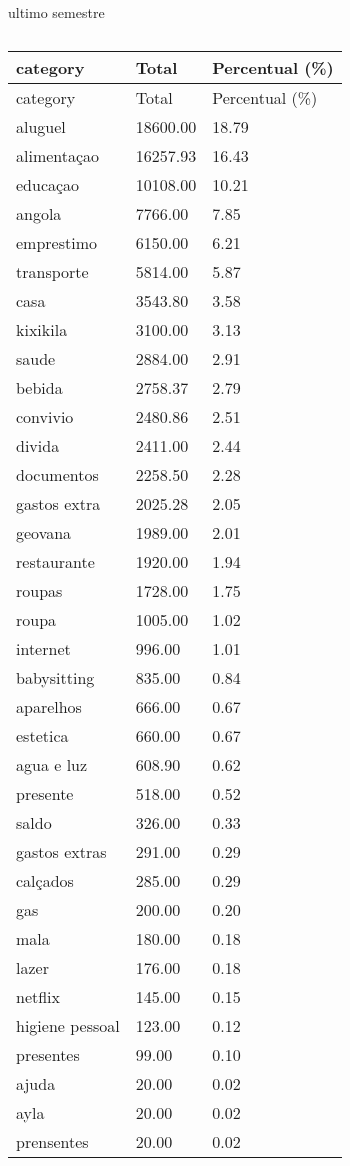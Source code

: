 \documentclass[
  8pt,
  a4paper,
  DIV=11,
  numbers=noendperiod]{scrartcl}
\begin{document}
\begin{figure}
\begin{minipage}{0.50\linewidth}
\end{minipage}%
%
\begin{minipage}{0.50\linewidth}
ultimo semestre

\begin{longtable}[]{@{}lll@{}}
\caption{}\label{T_dd870}\tabularnewline
\toprule\noalign{}
category & Total & Percentual (\%) \\
\midrule\noalign{}
\endfirsthead
\toprule\noalign{}
category & Total & Percentual (\%) \\
\midrule\noalign{}
\endhead
\bottomrule\noalign{}
\endlastfoot
aluguel & 18600.00 & 18.79 \\
alimentaçao & 16257.93 & 16.43 \\
educaçao & 10108.00 & 10.21 \\
angola & 7766.00 & 7.85 \\
emprestimo & 6150.00 & 6.21 \\
transporte & 5814.00 & 5.87 \\
casa & 3543.80 & 3.58 \\
kixikila & 3100.00 & 3.13 \\
saude & 2884.00 & 2.91 \\
bebida & 2758.37 & 2.79 \\
convivio & 2480.86 & 2.51 \\
divida & 2411.00 & 2.44 \\
documentos & 2258.50 & 2.28 \\
gastos extra & 2025.28 & 2.05 \\
geovana & 1989.00 & 2.01 \\
restaurante & 1920.00 & 1.94 \\
roupas & 1728.00 & 1.75 \\
roupa & 1005.00 & 1.02 \\
internet & 996.00 & 1.01 \\
babysitting & 835.00 & 0.84 \\
aparelhos & 666.00 & 0.67 \\
estetica & 660.00 & 0.67 \\
agua e luz & 608.90 & 0.62 \\
presente & 518.00 & 0.52 \\
saldo & 326.00 & 0.33 \\
gastos extras & 291.00 & 0.29 \\
calçados & 285.00 & 0.29 \\
gas & 200.00 & 0.20 \\
mala & 180.00 & 0.18 \\
lazer & 176.00 & 0.18 \\
netflix & 145.00 & 0.15 \\
higiene pessoal & 123.00 & 0.12 \\
presentes & 99.00 & 0.10 \\
ajuda & 20.00 & 0.02 \\
ayla & 20.00 & 0.02 \\
prensentes & 20.00 & 0.02 \\
\end{longtable}


\end{minipage}
\end{figure}
\end{document}
